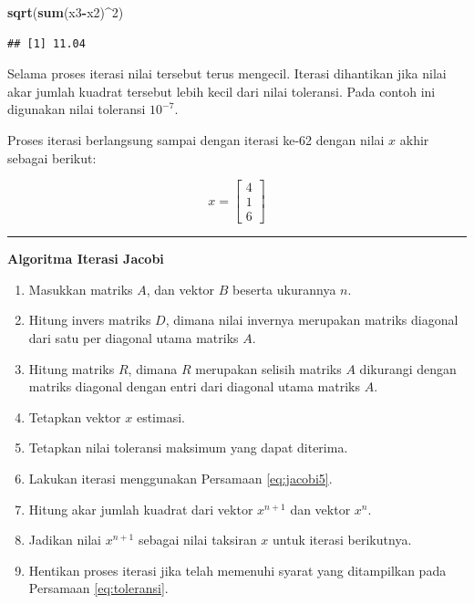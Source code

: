 \documentclass[
]{book}
\newenvironment{Shaded}{\begin{snugshade}}{\end{snugshade}}
\newcommand{\DecValTok}[1]{\textcolor[rgb]{0.00,0.00,0.81}{#1}}
\newcommand{\FunctionTok}[1]{\textcolor[rgb]{0.13,0.29,0.53}{\textbf{#1}}}
\newcommand{\NormalTok}[1]{#1}
\newcommand{\SpecialCharTok}[1]{\textcolor[rgb]{0.81,0.36,0.00}{\textbf{#1}}}
\providecommand{\tightlist}{%
  \setlength{\itemsep}{0pt}\setlength{\parskip}{0pt}}
\theoremstyle{definition}
\theoremstyle{definition}
\theoremstyle{definition}
\theoremstyle{definition}
\theoremstyle{remark}
\begin{document}
\begin{Shaded}
\begin{Highlighting}[]
\FunctionTok{sqrt}\NormalTok{(}\FunctionTok{sum}\NormalTok{(x3}\SpecialCharTok{{-}}\NormalTok{x2)}\SpecialCharTok{\^{}}\DecValTok{2}\NormalTok{)}
\end{Highlighting}
\end{Shaded}

\begin{verbatim}
## [1] 11.04
\end{verbatim}

Selama proses iterasi nilai tersebut terus mengecil. Iterasi dihantikan jika nilai akar jumlah kuadrat tersebut lebih kecil dari nilai toleransi. Pada contoh ini digunakan nilai toleransi \(10^{-7}\).

Proses iterasi berlangsung sampai dengan iterasi ke-62 dengan nilai \(x\) akhir sebagai berikut:

\[
x = \begin{bmatrix}
     4     \\[0.3em]
     1     \\[0.3em]
     6
\end{bmatrix}
\]

\begin{center}\rule{0.5\linewidth}{0.5pt}\end{center}

\textbf{Algoritma Iterasi Jacobi}

\begin{enumerate}
\def\labelenumi{\arabic{enumi}.}
\tightlist
\item
  Masukkan matriks \(A\), dan vektor \(B\) beserta ukurannya \(n\).
\item
  Hitung invers matriks \(D\), dimana nilai invernya merupakan matriks diagonal dari satu per diagonal utama matriks \(A\).
\item
  Hitung matriks \(R\), dimana \(R\) merupakan selisih matriks \(A\) dikurangi dengan matriks diagonal dengan entri dari diagonal utama matriks \(A\).
\item
  Tetapkan vektor \(x\) estimasi.
\item
  Tetapkan nilai toleransi maksimum yang dapat diterima.
\item
  Lakukan iterasi menggunakan Persamaan \eqref{eq:jacobi5}.
\item
  Hitung akar jumlah kuadrat dari vektor \(x^{n+1}\) dan vektor \(x^n\).
\item
  Jadikan nilai \(x^{n+1}\) sebagai nilai taksiran \(x\) untuk iterasi berikutnya.
\item
  Hentikan proses iterasi jika telah memenuhi syarat yang ditampilkan pada Persamaan \eqref{eq:toleransi}.
\end{enumerate}
\end{document}
